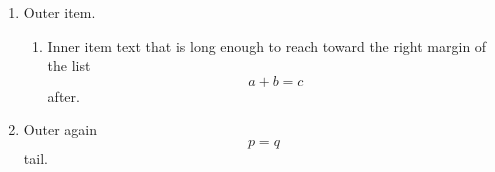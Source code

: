 \documentclass[10pt]{article}
\begin{document}
\begin{enumerate}
\item Outer item.
\begin{enumerate}
\item Inner item text that is long enough to reach toward the right margin of the list
\[ a + b = c \]
after.
\end{enumerate}
\item Outer again \begin{equation} p = q \end{equation} tail.
\end{enumerate}
\end{document}
